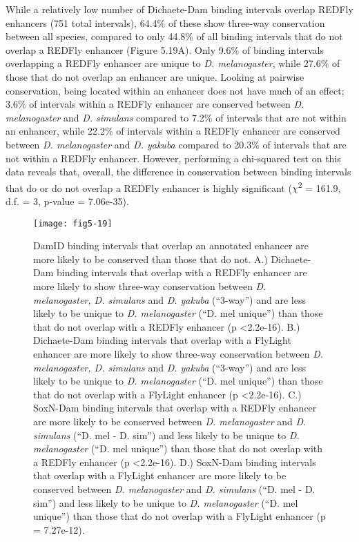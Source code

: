 While a relatively low number of Dichaete-Dam binding intervals overlap REDFly enhancers (751 total intervals), 64.4\% of these show three-way conservation between all species, compared to only 44.8\% of all binding intervals that do not overlap a REDFly enhancer (Figure 5.19A). Only 9.6\% of binding intervals overlapping a REDFly enhancer are unique to \emph{D. melanogaster}, while 27.6\% of those that do not overlap an enhancer are unique. Looking at pairwise conservation, being located within an enhancer does not have much of an effect; 3.6\% of intervals within a REDFly enhancer are conserved between \emph{D. melanogaster} and \emph{D. simulans} compared to 7.2\% of intervals that are not within an enhancer, while 22.2\% of intervals within a REDFly enhancer are conserved between \emph{D. melanogaster} and \emph{D. yakuba} compared to 20.3\% of intervals that are not within a REDFly enhancer. However, performing a chi-squared test on this data reveals that, overall, the difference in conservation between binding intervals that do or do not overlap a REDFly enhancer is highly significant (\(\chi\)\textsuperscript{2} = 161.9, d.f. = 3, p-value = 7.06e-35).\\

\begin{figure}
\centering
\texttt{[image: fig5-19]}
\caption{DamID binding intervals that overlap an annotated enhancer are more likely to be conserved than those that do not. A.) Dichaete-Dam binding intervals that overlap with a REDFly enhancer are more likely to show three-way conservation between \emph{D. melanogaster, D. simulans} and \emph{D. yakuba} (“3-way”) and are less likely to be unique to \emph{D. melanogaster}  (“D. mel unique”) than those that do not overlap with a REDFly enhancer (p \textless 2.2e-16).  B.) Dichaete-Dam binding intervals that overlap with a FlyLight enhancer are more likely to show three-way conservation between \emph{D. melanogaster, D. simulans} and \emph{D. yakuba} (“3-way”) and are less likely to be unique to \emph{D. melanogaster}  (“D. mel unique”) than those that do not overlap with a FlyLight enhancer (p \textless 2.2e-16). C.) SoxN-Dam binding intervals that overlap with a REDFly enhancer are more likely to be conserved between \emph{D. melanogaster} and \emph{D. simulans} (“D. mel - D. sim”) and less likely to be unique to \emph{D. melanogaster} (“D. mel unique”) than those that do not overlap with a REDFly enhancer (p \textless 2.2e-16). D.) SoxN-Dam binding intervals that overlap with a FlyLight enhancer are more likely to be conserved between \emph{D. melanogaster} and \emph{D. simulans} (“D. mel - D. sim”) and less likely to be unique to \emph{D. melanogaster} (“D. mel unique”) than those that do not overlap with a FlyLight enhancer (p = 7.27e-12).}
\label{Figure 5.19}
\end{figure}
 
